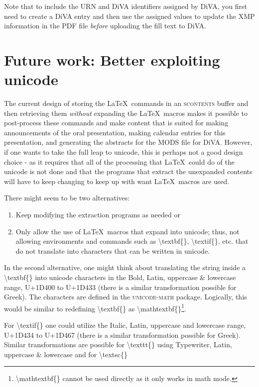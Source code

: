 Note that to include the URN and DiVA identifiers assigned by DiVA, you first need to create a DiVA entry and then use the assigned values to update the XMP information in the PDF file \textit{before} uploading the fill text to DiVA.

\section{Future work: Better exploiting unicode}
\label{sec:betterExploitingUnicode}

The current design of storing the \LaTeX\ commands in an \textsc{scontents} buffer and then retrieving them \textit{without} expanding the \LaTeX\ macros makes it possible to post-process these commands and make content that is suited for making announcements of the oral presentation, making calendar entries for this presentation, and generating the abstracts for the MODS file for DiVA. However,  if one wants to take the full leap to unicode, this is perhaps not a good design choice - as it requires that all of the processing that \LaTeX\ could do of the unicode is not done and that the programs that extract the unexpanded contents will have to keep changing to keep up with want \LaTeX\ macros are used. 

There might seem to be two alternatives:
\begin{enumerate}
    \item Keep modifying the extraction programs as needed or
    \item Only allow the use of \LaTeX\ macros that expand into unicode; thus, not allowing environments and commands such as \textbackslash textbf\{\}, \textbackslash textif\{\}, etc. that do not translate into characters that can be written in unicode.
\end{enumerate}

In the second alternative, one might think about translating the string inside a \textbackslash textbf\{\} into unicode characters in the Bold, Latin, uppercase \& lowercase range, \ie U+1D400 to U+1D433 (there is a similar transformation possible for Greek). The characters are defined in the \textsc{unicode-math} package. Logically, this would be similar to redefining \textbackslash textbf\{\} as \textbackslash mathtextbf\{\}\footnote{\textbackslash mathtextbf\{\} cannot be used directly as it only works in math mode.}.  

For \textbackslash textif\{\} one could utilize the Italic, Latin, uppercase  and lowercase range, \ie U+1D434 to U+1D467 (there is a similar transformation possible for Greek). Similar transformations are possible for \textbackslash texttt\{\}
using Typewriter, Latin, uppercase \& lowercase and for \textbackslash textsc\{\}

